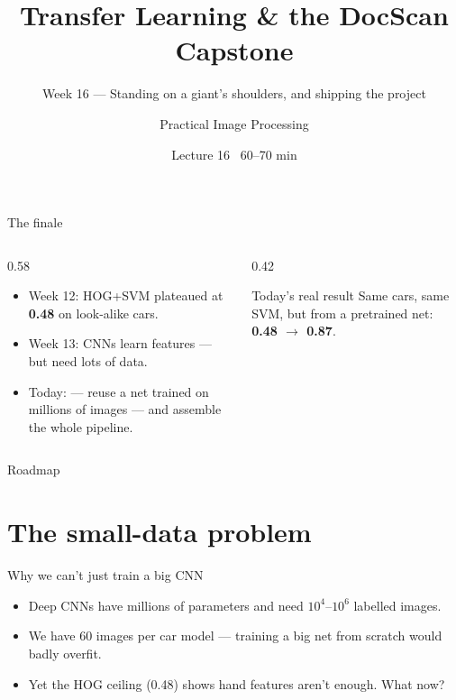 \documentclass[10pt,aspectratio=169]{beamer}
\title{Transfer Learning \& the DocScan Capstone}
\subtitle{Week 16 — Standing on a giant's shoulders, and shipping the project}
\author{Practical Image Processing}
\date{Lecture 16 \textbullet\ 60--70 min}
\begin{document}
\maketitle

\begin{frame}{The finale}
  \begin{columns}[T]
    \begin{column}{0.58\textwidth}
      \begin{itemize}
        \item Week 12: HOG+SVM plateaued at \textbf{0.48} on look-alike cars.
        \item Week 13: CNNs learn features — but need lots of data.
        \item \alert{Today:}  — reuse a net trained on millions of images —
              and assemble the whole  pipeline.
      \end{itemize}
    \end{column}
    \begin{column}{0.42\textwidth}
      \begin{alertblock}{Today's real result}
        Same cars, same SVM, but  from a pretrained net:
        \textbf{0.48 $\rightarrow$ 0.87}.
      \end{alertblock}
    \end{column}
  \end{columns}
\end{frame}

\begin{frame}{Roadmap}\tableofcontents\end{frame}

\section{The small-data problem}

\begin{frame}{Why we can't just train a big CNN}
  \begin{itemize}
    \item Deep CNNs have millions of parameters and need $10^4$--$10^6$ labelled images.
    \item We have 60 images per car model — training a big net from scratch would badly overfit.
    \item Yet the HOG ceiling (0.48) shows hand features aren't enough. What now?
  \end{itemize}
\end{frame}
\end{document}
